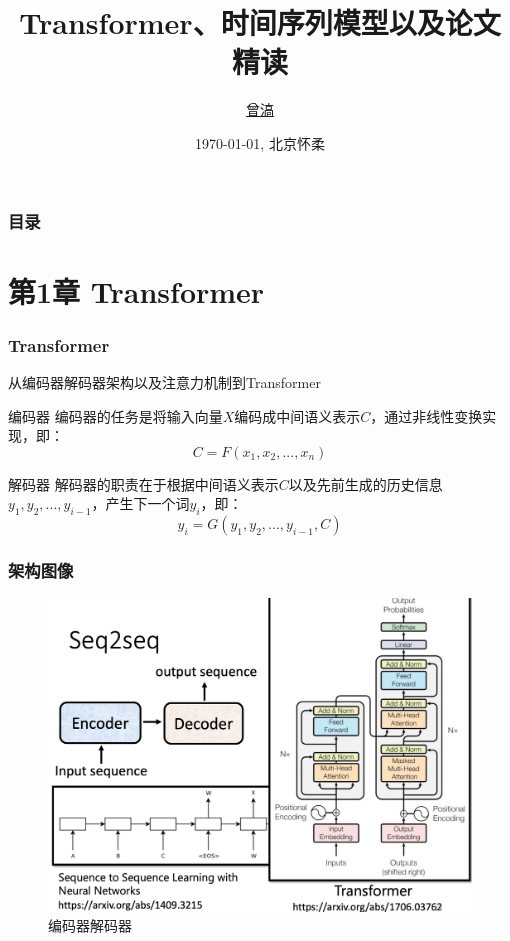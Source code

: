 \documentclass[10pt]{ctexbeamer}
\title[UCAS Beamer (\LaTeX{})]{Transformer、时间序列模型以及论文精读}
\author[H. Zeng]{\href{mailto:haozeng1210@gmail.com}{曾滈}}
\institute[NAOC]{中国科学院国家天文台}
\date[\today]{\today, 北京怀柔}
\begin{document}
\begin{frame}[plain]
  \maketitle
\end{frame}

\begin{frame}[t]
  \frametitle{目录}
  \tableofcontents
\end{frame}

\section[transformer]{ 第1章 Transformer}\label{sec:1}


\begin{frame}[t]
  \frametitle{Transformer}
  从编码器解码器架构以及注意力机制到Transformer

  \begin{block}{编码器}
    编码器的任务是将输入向量$X$编码成中间语义表示$C$，通过非线性变换实现，即：
    \begin{equation}
      C = F(x_1, x_2, ..., x_n)
      \label{eq:编码器}
    \end{equation}
  \end{block}

  \begin{block}{解码器}
    解码器的职责在于根据中间语义表示$C$以及先前生成的历史信息$y_1, y_2, ..., y_{i-1}$，产生下一个词$y_i$，即：
    \begin{equation}
      y_i = G(y_1, y_2, ..., y_{i-1}, C)
      \label{eq:解码器}
    \end{equation}
  \end{block}
\end{frame}


\begin{frame}[t]
  \frametitle{架构图像}
  \begin{figure}
    \includegraphics[width=.8\textwidth, height=.8\textheight, keepaspectratio]{encoder_decoder.png}
    \caption{编码器解码器}
  \end{figure}
\end{frame}
\end{document}
